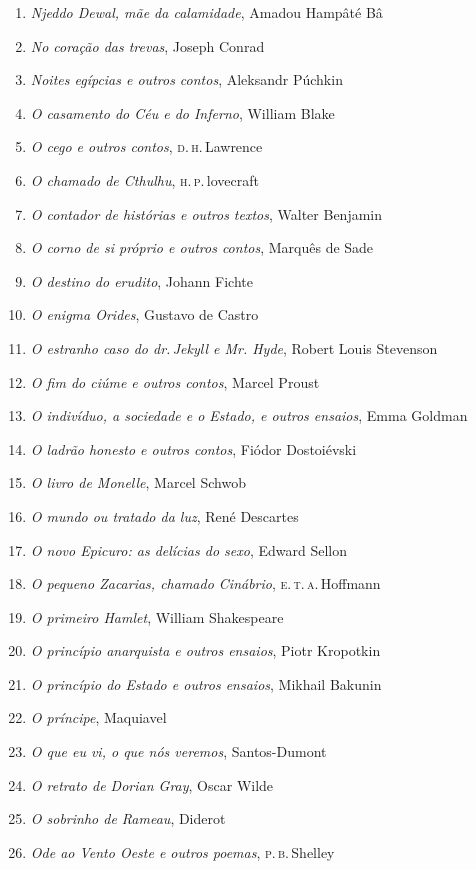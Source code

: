 \begin{enumerate}
\item \textit{Njeddo Dewal, mãe da calamidade}, Amadou Hampâté Bâ 
\item \textit{No coração das trevas}, Joseph Conrad
\item \textit{Noites egípcias e outros contos}, Aleksandr Púchkin
\item \textit{O casamento do Céu e do Inferno}, William Blake
\item \textit{O cego e outros contos}, \textsc{d.\,h}.\,Lawrence
\item \textit{O chamado de Cthulhu}, \textsc{h.\,p.}\,lovecraft
\item \textit{O contador de histórias e outros textos}, Walter Benjamin
\item \textit{O corno de si próprio e outros contos}, Marquês de Sade
\item \textit{O destino do erudito}, Johann Fichte
\item \textit{O enigma Orides}, Gustavo de Castro
\item \textit{O estranho caso do dr.\,Jekyll e Mr. Hyde}, Robert Louis Stevenson
\item \textit{O fim do ciúme e outros contos}, Marcel Proust
\item \textit{O indivíduo, a sociedade e o Estado, e outros ensaios}, Emma Goldman
\item \textit{O ladrão honesto e outros contos}, Fiódor Dostoiévski
\item \textit{O livro de Monelle}, Marcel Schwob
\item \textit{O mundo ou tratado da luz}, René Descartes
\item \textit{O novo Epicuro: as delícias do sexo}, Edward Sellon
\item \textit{O pequeno Zacarias, chamado Cinábrio}, \textsc{e.\,t.\,a.}\,Hoffmann
\item \textit{O primeiro Hamlet}, William Shakespeare
\item \textit{O princípio anarquista e outros ensaios}, Piotr Kropotkin
\item \textit{O princípio do Estado e outros ensaios}, Mikhail Bakunin
\item \textit{O príncipe}, Maquiavel
\item \textit{O que eu vi, o que nós veremos}, Santos-Dumont
\item \textit{O retrato de Dorian Gray}, Oscar Wilde
\item \textit{O sobrinho de Rameau}, Diderot
\item \textit{Ode ao Vento Oeste e outros poemas}, \textsc{p.\,b.}\,Shelley

\end{enumerate}
